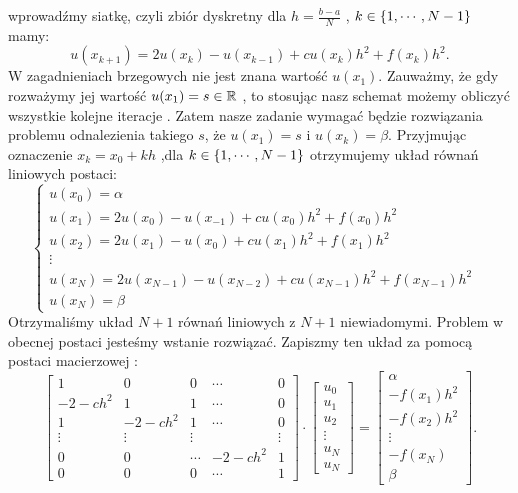\documentclass[12pt,a4paper]{report}
\begin{document}
wprowadźmy siatkę, czyli zbiór dyskretny dla $ h= \frac{b-a}{N}$ , $k \in \left\lbrace {1,\cdots,N-1} \right\rbrace$  mamy: 
\begin{equation} \label{boundary_model}
u(x_{k+1}) = 2u(x_k) - u(x_{k-1}) + cu(x_k)h^2 + f(x_k)h^2.
\end{equation}
W zagadnieniach brzegowych nie jest znana wartość $u(x_1)$. Zauważmy, że gdy rozważymy jej wartość $u(x_1) = s \in \mathbb{R}$ , to stosując nasz schemat możemy obliczyć wszystkie kolejne iteracje . Zatem nasze zadanie wymagać będzie rozwiązania problemu odnalezienia takiego $s$, że $u(x_1) = s$ i $u(x_k) = \beta$. Przyjmując oznaczenie $ x_k = x_0 + kh$ ,dla $ k \in \left\lbrace {1, \cdots,N-1} \right\rbrace $ otrzymujemy układ równań liniowych postaci:
\begin{equation}
\left\{ \begin{array}{ll}
u(x_0) = \alpha & \\
u(x_1) = 2u(x_0) - u(x_{-1}) + cu(x_0)h^2 + f(x_0)h^2 & \\
u(x_2) = 2u(x_1) - u(x_{0}) + cu(x_1)h^2 + f(x_1)h^2 & \\ 
\vdots  & \\
u(x_{N}) = 2u(x_{N-1}) - u(x_{N-2}) + cu(x_{N-1})h^2 + f(x_{N-1})h^2  & \\
u(x_N) = \beta &
\end{array} \right.
\end{equation}
Otrzymaliśmy układ $N+1$ równań liniowych z $N+1$ niewiadomymi. Problem w obecnej postaci jesteśmy wstanie rozwiązać. Zapiszmy ten układ za pomocą postaci macierzowej :
$$ 
\left[ \begin{array}{ccccc}
1 & 0 & 0 & \cdots &0 \\
-2-ch^2 & 1 & 1 &\cdots &0 \\
1 & -2-ch^2 & 1 &\cdots &0 \\
\vdots & \vdots & \vdots &  &\vdots \\
0& 0 & \cdots& -2-ch^2 & 1 \\
0 & 0 & 0&\cdots & 1 
\end{array} \right] \cdot
\left[ \begin{array}{c}
u_0 \\
u_1 \\
u_2 \\
\vdots \\
u_{N} \\
u_{N}  
\end{array} \right] =
\left[ \begin{array}{c}
\alpha \\
-f(x_1)h^2 \\
-f(x_2)h^2\\
\vdots \\
-f(x_{N}) \\
\beta   
\end{array} \right] .
$$
\end{document}
